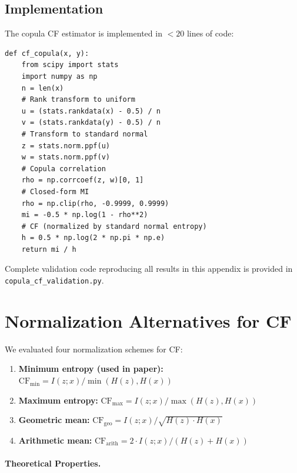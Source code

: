 \documentclass[10pt]{article} %
\theoremstyle{plain}
\theoremstyle{definition}
\begin{document}
\subsection{Implementation}

The copula CF estimator is implemented in $<20$ lines of code:

\begin{verbatim}
def cf_copula(x, y):
    from scipy import stats
    import numpy as np
    n = len(x)
    # Rank transform to uniform
    u = (stats.rankdata(x) - 0.5) / n
    v = (stats.rankdata(y) - 0.5) / n
    # Transform to standard normal
    z = stats.norm.ppf(u)
    w = stats.norm.ppf(v)
    # Copula correlation
    rho = np.corrcoef(z, w)[0, 1]
    # Closed-form MI
    rho = np.clip(rho, -0.9999, 0.9999)
    mi = -0.5 * np.log(1 - rho**2)
    # CF (normalized by standard normal entropy)
    h = 0.5 * np.log(2 * np.pi * np.e)
    return mi / h
\end{verbatim}

Complete validation code reproducing all results in this appendix is provided in \texttt{copula\_cf\_validation.py}.

\section{Normalization Alternatives for CF}
\label{app:normalization}

We evaluated four normalization schemes for CF:

\begin{enumerate}
    \item \textbf{Minimum entropy (used in paper):} $\text{CF}_{\min} = I(z;x) / \min(H(z), H(x))$
    \item \textbf{Maximum entropy:} $\text{CF}_{\max} = I(z;x) / \max(H(z), H(x))$
    \item \textbf{Geometric mean:} $\text{CF}_{\text{geo}} = I(z;x) / \sqrt{H(z) \cdot H(x)}$
    \item \textbf{Arithmetic mean:} $\text{CF}_{\text{arith}} = 2 \cdot I(z;x) / (H(z) + H(x))$
\end{enumerate}

\paragraph{Theoretical Properties.}
\end{document}
